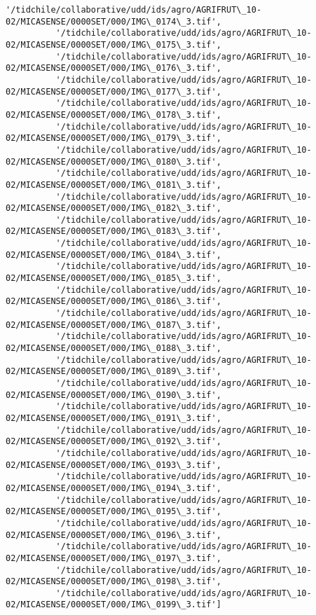 \documentclass[11pt]{article}
\begin{document}
\begin{Verbatim}[commandchars=\\\{\}]
          '/tidchile/collaborative/udd/ids/agro/AGRIFRUT\_10-02/MICASENSE/0000SET/000/IMG\_0174\_3.tif',
          '/tidchile/collaborative/udd/ids/agro/AGRIFRUT\_10-02/MICASENSE/0000SET/000/IMG\_0175\_3.tif',
          '/tidchile/collaborative/udd/ids/agro/AGRIFRUT\_10-02/MICASENSE/0000SET/000/IMG\_0176\_3.tif',
          '/tidchile/collaborative/udd/ids/agro/AGRIFRUT\_10-02/MICASENSE/0000SET/000/IMG\_0177\_3.tif',
          '/tidchile/collaborative/udd/ids/agro/AGRIFRUT\_10-02/MICASENSE/0000SET/000/IMG\_0178\_3.tif',
          '/tidchile/collaborative/udd/ids/agro/AGRIFRUT\_10-02/MICASENSE/0000SET/000/IMG\_0179\_3.tif',
          '/tidchile/collaborative/udd/ids/agro/AGRIFRUT\_10-02/MICASENSE/0000SET/000/IMG\_0180\_3.tif',
          '/tidchile/collaborative/udd/ids/agro/AGRIFRUT\_10-02/MICASENSE/0000SET/000/IMG\_0181\_3.tif',
          '/tidchile/collaborative/udd/ids/agro/AGRIFRUT\_10-02/MICASENSE/0000SET/000/IMG\_0182\_3.tif',
          '/tidchile/collaborative/udd/ids/agro/AGRIFRUT\_10-02/MICASENSE/0000SET/000/IMG\_0183\_3.tif',
          '/tidchile/collaborative/udd/ids/agro/AGRIFRUT\_10-02/MICASENSE/0000SET/000/IMG\_0184\_3.tif',
          '/tidchile/collaborative/udd/ids/agro/AGRIFRUT\_10-02/MICASENSE/0000SET/000/IMG\_0185\_3.tif',
          '/tidchile/collaborative/udd/ids/agro/AGRIFRUT\_10-02/MICASENSE/0000SET/000/IMG\_0186\_3.tif',
          '/tidchile/collaborative/udd/ids/agro/AGRIFRUT\_10-02/MICASENSE/0000SET/000/IMG\_0187\_3.tif',
          '/tidchile/collaborative/udd/ids/agro/AGRIFRUT\_10-02/MICASENSE/0000SET/000/IMG\_0188\_3.tif',
          '/tidchile/collaborative/udd/ids/agro/AGRIFRUT\_10-02/MICASENSE/0000SET/000/IMG\_0189\_3.tif',
          '/tidchile/collaborative/udd/ids/agro/AGRIFRUT\_10-02/MICASENSE/0000SET/000/IMG\_0190\_3.tif',
          '/tidchile/collaborative/udd/ids/agro/AGRIFRUT\_10-02/MICASENSE/0000SET/000/IMG\_0191\_3.tif',
          '/tidchile/collaborative/udd/ids/agro/AGRIFRUT\_10-02/MICASENSE/0000SET/000/IMG\_0192\_3.tif',
          '/tidchile/collaborative/udd/ids/agro/AGRIFRUT\_10-02/MICASENSE/0000SET/000/IMG\_0193\_3.tif',
          '/tidchile/collaborative/udd/ids/agro/AGRIFRUT\_10-02/MICASENSE/0000SET/000/IMG\_0194\_3.tif',
          '/tidchile/collaborative/udd/ids/agro/AGRIFRUT\_10-02/MICASENSE/0000SET/000/IMG\_0195\_3.tif',
          '/tidchile/collaborative/udd/ids/agro/AGRIFRUT\_10-02/MICASENSE/0000SET/000/IMG\_0196\_3.tif',
          '/tidchile/collaborative/udd/ids/agro/AGRIFRUT\_10-02/MICASENSE/0000SET/000/IMG\_0197\_3.tif',
          '/tidchile/collaborative/udd/ids/agro/AGRIFRUT\_10-02/MICASENSE/0000SET/000/IMG\_0198\_3.tif',
          '/tidchile/collaborative/udd/ids/agro/AGRIFRUT\_10-02/MICASENSE/0000SET/000/IMG\_0199\_3.tif']
\end{Verbatim}
            
\end{document}
